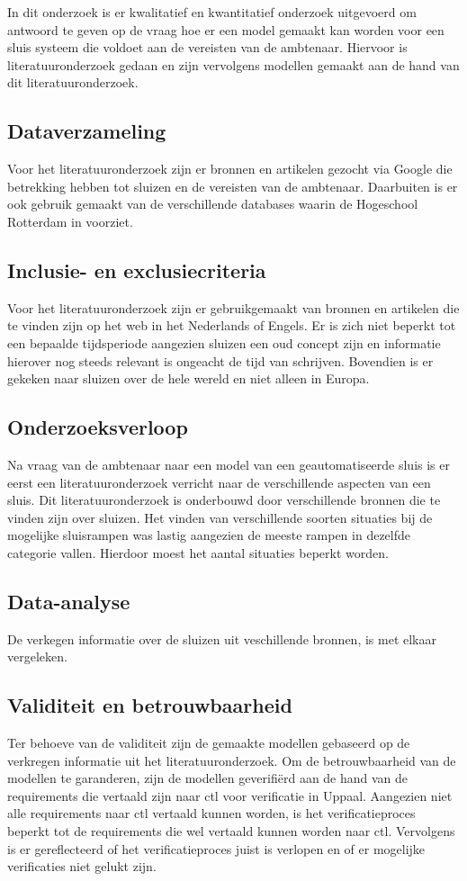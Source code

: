 \documentclass[../verslag.tex]{subfiles}
\begin{document}
In dit onderzoek is er kwalitatief en kwantitatief onderzoek uitgevoerd om antwoord te geven op de vraag hoe er een model gemaakt kan worden voor een sluis systeem die voldoet aan de vereisten van de ambtenaar.
Hiervoor is literatuuronderzoek gedaan en zijn vervolgens modellen gemaakt aan de hand van dit literatuuronderzoek.

\subsection{Dataverzameling}
Voor het literatuuronderzoek zijn er bronnen en artikelen gezocht via Google die betrekking hebben tot sluizen en de vereisten van de ambtenaar.
Daarbuiten is er ook gebruik gemaakt van de verschillende databases waarin de Hogeschool Rotterdam in voorziet.

\subsection{Inclusie- en exclusiecriteria}
Voor het literatuuronderzoek zijn er gebruikgemaakt van bronnen en artikelen die te vinden zijn op het web in het Nederlands of Engels.
Er is zich niet beperkt tot een bepaalde tijdsperiode aangezien sluizen een oud concept zijn en informatie hierover nog steeds relevant is ongeacht de tijd van schrijven.
Bovendien is er gekeken naar sluizen over de hele wereld en niet alleen in Europa.
\subsection{Onderzoeksverloop}
Na vraag van de ambtenaar naar een model van een geautomatiseerde sluis is er eerst een literatuuronderzoek verricht naar de verschillende aspecten van een sluis.
Dit literatuuronderzoek is onderbouwd door verschillende bronnen die te vinden zijn over sluizen.
Het vinden van verschillende soorten situaties bij de mogelijke sluisrampen was lastig aangezien de meeste rampen in dezelfde categorie vallen.
Hierdoor moest het aantal situaties beperkt worden.
\subsection{Data-analyse}
De verkegen informatie over de sluizen uit veschillende bronnen, is met elkaar vergeleken.
\subsection{Validiteit en betrouwbaarheid}
Ter behoeve van de validiteit zijn de gemaakte modellen gebaseerd op de verkregen informatie uit het literatuuronderzoek.
Om de betrouwbaarheid van de modellen te garanderen, zijn de modellen geverifiërd aan de hand van de requirements die vertaald zijn naar ctl voor verificatie in Uppaal.
Aangezien niet alle requirements naar ctl vertaald kunnen worden, is het verificatieproces beperkt tot de requirements die wel vertaald kunnen worden naar ctl.
Vervolgens is er gereflecteerd of het verificatieproces juist is verlopen en of er mogelijke verificaties niet gelukt zijn.
\end{document}
